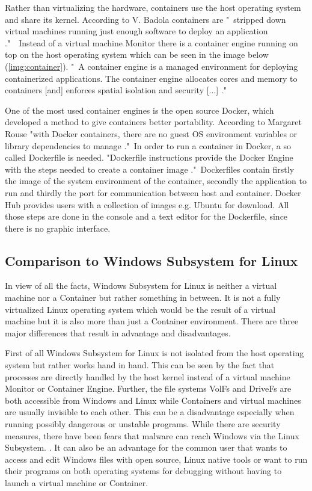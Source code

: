 \documentclass[utf8,biblatex, ngerman, english]{lni}
\begin{document}
Rather than virtualizing the hardware, containers use the host operating system and share its kernel. According to V. Badola containers are "\ stripped down virtual machines running just enough software to deploy an application \cite{Ba15}."\ \ Instead of a virtual machine Monitor there is a container engine running on top on the host operating system which can be seen in the image below (\ref{img:container}). "\ A container engine is a managed environment for deploying containerized applications. The container engine allocates cores and memory to containers [and] enforces spatial isolation and security [...] \cite{Do17}."

One of the most used container engines is the open source Docker, which developed a method to give containers better portability. According to Margaret Rouse "with Docker containers, there are no guest OS environment variables or library dependencies to manage \cite{Ma}."\ In order to run a container in Docker, a so called Dockerfile is needed. "Dockerfile instructions provide the Docker Engine with the steps needed to create a container image \cite{La16}."\ Dockerfiles contain firstly the image of the system environment of the container, secondly the application to run and thirdly the port for communication between host and container. Docker Hub provides users with a collection of images e.g. Ubuntu for download. All those steps are done in the console and a text editor for the Dockerfile, since there is no graphic interface.

\subsection{Comparison to Windows Subsystem for Linux}

In view of all the facts, Windows Subsystem for Linux is neither a virtual machine nor a Container but rather something in between. It is not a fully virtualized Linux operating system which would be the result of a virtual machine but it is also more than just a Container environment. There are three major differences that result in advantage and disadvantages. 

First of all Windows Subsystem for Linux is not isolated from the host operating system but rather works hand in hand. This can be seen by the fact that processes are directly handled by the host kernel instead of a virtual machine Monitor or Container Engine. Further, the file systems VolFs and DriveFs are both accessible from Windows and Linux while Containers and virtual machines are usually invisible to each other. This can be a disadvantage especially when running possibly dangerous or unstable programs. While there are security measures, there have been fears that malware can reach Windows via the Linux Subsystem. \cite{Tu17}. It can also be an advantage for the common user that wants to access and edit Windows files with open source, Linux native tools or want to run their programs on both operating systems for debugging without having to launch a virtual machine or Container.
\end{document}
